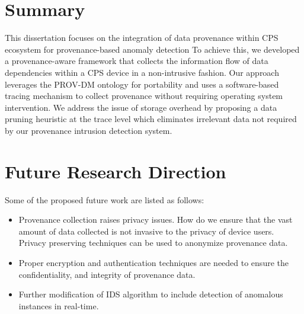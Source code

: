 

\section{Summary}
This dissertation focuses on the integration of data provenance within CPS ecosystem for provenance-based anomaly detection  To achieve this, we developed a provenance-aware framework that collects the information flow of data dependencies within a CPS device in a non-intrusive fashion. Our approach leverages the PROV-DM ontology for portability and uses a software-based tracing mechanism to collect provenance without requiring operating system intervention. We address the issue of storage overhead by proposing a data pruning heuristic at the trace level which eliminates irrelevant data not required by our provenance intrusion detection system. 



\section{Future Research Direction}

Some of the proposed future work are listed as follows:

\begin{itemize}

\item Provenance collection raises privacy issues. How do we ensure that the vast amount of data collected is not invasive to the privacy of device users. Privacy preserving techniques can be used to anonymize provenance data.

\item Proper encryption and authentication techniques \cite{Hasan:2009:CFP:1525908.1525909} are needed to ensure the confidentiality, and integrity of provenance data.

\item Further modification of IDS algorithm to include detection of anomalous instances in real-time. 

\end{itemize}

